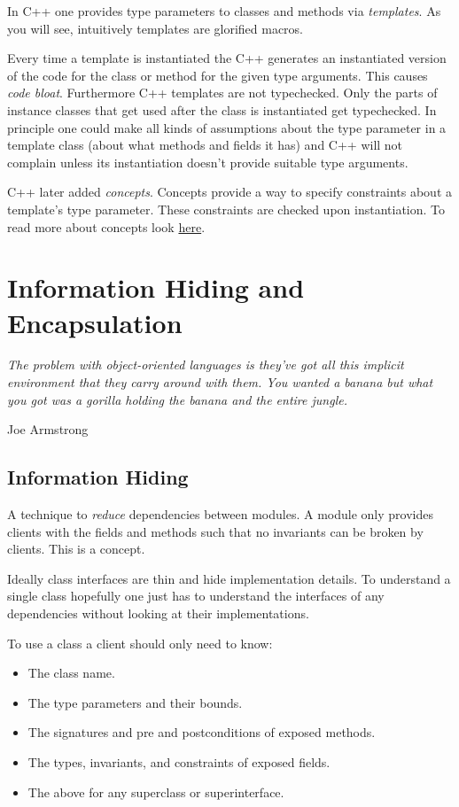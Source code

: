 \documentclass{article}
\begin{document}
In C++ one provides type parameters to classes and methods via \textit{templates}. As you will see, intuitively templates are glorified macros.

Every time a template is instantiated the C++ generates an instantiated version of the code for the class or method for the given type arguments. This causes \textit{code bloat}. Furthermore C++ templates are not typechecked. Only the parts of instance classes that get used after the class is instantiated get typechecked. In principle one could make all kinds of assumptions about the type parameter in a template class (about what methods and fields it has) and C++ will not complain unless its instantiation doesn't provide suitable type arguments.

C++ later added \textit{concepts}.
Concepts provide a way to specify constraints about a template's type parameter. These constraints are checked upon instantiation.
To read more about concepts look \href{https://en.cppreference.com/w/cpp/language/constraints}{here}.

\section{Information Hiding and Encapsulation}

\epigraph{\itshape The problem with object-oriented languages is they’ve got all this implicit environment that they carry around with them. You wanted a banana but what you got was a gorilla holding the banana and the entire jungle.}{Joe Armstrong}

\subsection{Information Hiding}

\begin{definition}
A technique to \textit{reduce} dependencies between modules.
A module only provides clients with the fields and methods such that no invariants can be broken by clients.
This is a \textit{\static{}} concept.
\end{definition}

Ideally class interfaces are thin and hide implementation details.
To understand a single class hopefully one just has to understand the interfaces of any dependencies without looking at their implementations.

To use a class a client should only need to know:
\begin{itemize}
\item The class name.
\item The type parameters and their bounds.
\item The signatures and pre and postconditions of exposed methods.
\item The types, invariants, and constraints of exposed fields.
\item The above for any superclass or superinterface.
\end{itemize}
\end{document}
